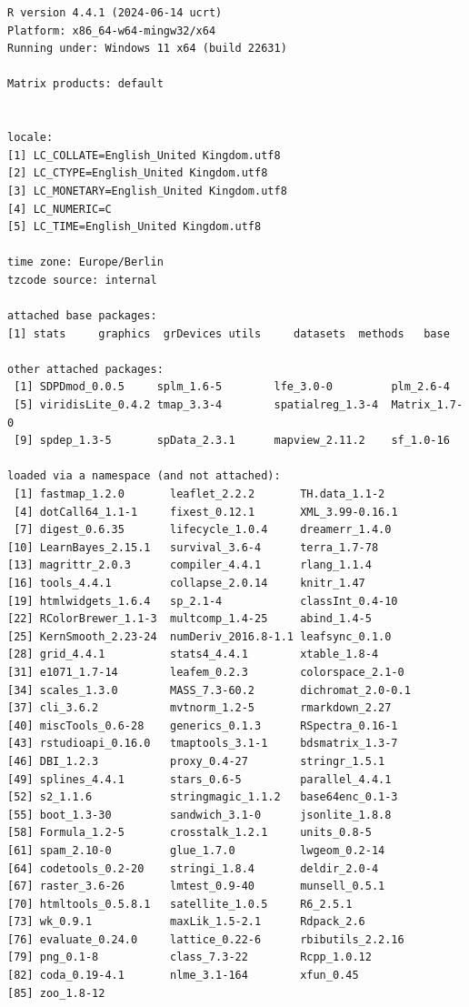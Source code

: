 \documentclass[
  letterpaper,
  DIV=11,
  numbers=noendperiod]{scrreprt}
\begin{document}
\begin{verbatim}
R version 4.4.1 (2024-06-14 ucrt)
Platform: x86_64-w64-mingw32/x64
Running under: Windows 11 x64 (build 22631)

Matrix products: default


locale:
[1] LC_COLLATE=English_United Kingdom.utf8 
[2] LC_CTYPE=English_United Kingdom.utf8   
[3] LC_MONETARY=English_United Kingdom.utf8
[4] LC_NUMERIC=C                           
[5] LC_TIME=English_United Kingdom.utf8    

time zone: Europe/Berlin
tzcode source: internal

attached base packages:
[1] stats     graphics  grDevices utils     datasets  methods   base     

other attached packages:
 [1] SDPDmod_0.0.5     splm_1.6-5        lfe_3.0-0         plm_2.6-4        
 [5] viridisLite_0.4.2 tmap_3.3-4        spatialreg_1.3-4  Matrix_1.7-0     
 [9] spdep_1.3-5       spData_2.3.1      mapview_2.11.2    sf_1.0-16        

loaded via a namespace (and not attached):
 [1] fastmap_1.2.0       leaflet_2.2.2       TH.data_1.1-2      
 [4] dotCall64_1.1-1     fixest_0.12.1       XML_3.99-0.16.1    
 [7] digest_0.6.35       lifecycle_1.0.4     dreamerr_1.4.0     
[10] LearnBayes_2.15.1   survival_3.6-4      terra_1.7-78       
[13] magrittr_2.0.3      compiler_4.4.1      rlang_1.1.4        
[16] tools_4.4.1         collapse_2.0.14     knitr_1.47         
[19] htmlwidgets_1.6.4   sp_2.1-4            classInt_0.4-10    
[22] RColorBrewer_1.1-3  multcomp_1.4-25     abind_1.4-5        
[25] KernSmooth_2.23-24  numDeriv_2016.8-1.1 leafsync_0.1.0     
[28] grid_4.4.1          stats4_4.4.1        xtable_1.8-4       
[31] e1071_1.7-14        leafem_0.2.3        colorspace_2.1-0   
[34] scales_1.3.0        MASS_7.3-60.2       dichromat_2.0-0.1  
[37] cli_3.6.2           mvtnorm_1.2-5       rmarkdown_2.27     
[40] miscTools_0.6-28    generics_0.1.3      RSpectra_0.16-1    
[43] rstudioapi_0.16.0   tmaptools_3.1-1     bdsmatrix_1.3-7    
[46] DBI_1.2.3           proxy_0.4-27        stringr_1.5.1      
[49] splines_4.4.1       stars_0.6-5         parallel_4.4.1     
[52] s2_1.1.6            stringmagic_1.1.2   base64enc_0.1-3    
[55] boot_1.3-30         sandwich_3.1-0      jsonlite_1.8.8     
[58] Formula_1.2-5       crosstalk_1.2.1     units_0.8-5        
[61] spam_2.10-0         glue_1.7.0          lwgeom_0.2-14      
[64] codetools_0.2-20    stringi_1.8.4       deldir_2.0-4       
[67] raster_3.6-26       lmtest_0.9-40       munsell_0.5.1      
[70] htmltools_0.5.8.1   satellite_1.0.5     R6_2.5.1           
[73] wk_0.9.1            maxLik_1.5-2.1      Rdpack_2.6         
[76] evaluate_0.24.0     lattice_0.22-6      rbibutils_2.2.16   
[79] png_0.1-8           class_7.3-22        Rcpp_1.0.12        
[82] coda_0.19-4.1       nlme_3.1-164        xfun_0.45          
[85] zoo_1.8-12         
\end{verbatim}
\end{document}
